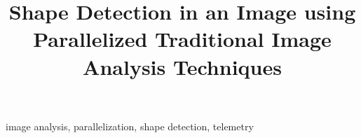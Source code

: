 \documentclass[conference]{IEEEtran}
\begin{document}
\title{Shape Detection in an Image using Parallelized Traditional Image Analysis Techniques\\
}

\author{
}

\maketitle



\begin{IEEEkeywords}
image analysis, parallelization, shape detection, telemetry
\end{IEEEkeywords}

\end{document}
